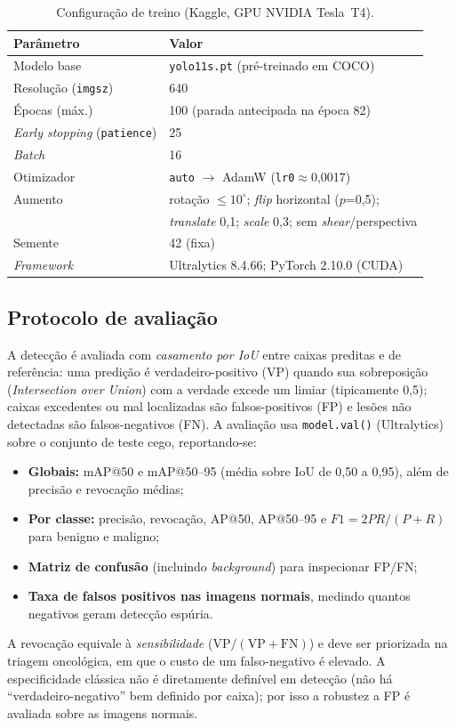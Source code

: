 \documentclass[11pt,a4paper]{article}
\begin{document}
\begin{table}[t]
\centering
\caption{Configuração de treino (Kaggle, GPU NVIDIA Tesla~T4).}
\label{tab:treino}
\small
\begin{tabular}{@{}ll@{}}
\toprule
\textbf{Parâmetro} & \textbf{Valor} \\
\midrule
Modelo base                  & \texttt{yolo11s.pt} (pré-treinado em COCO) \\
Resolução (\texttt{imgsz})   & 640 \\
Épocas (máx.)                & 100 (parada antecipada na época 82) \\
\textit{Early stopping} (\texttt{patience}) & 25 \\
\textit{Batch}               & 16 \\
Otimizador                   & \texttt{auto} $\rightarrow$ AdamW (\texttt{lr0}$\approx$0,0017) \\
Aumento                      & rotação $\leq 10^\circ$; \textit{flip} horizontal ($p$=0,5); \\
                             & \textit{translate} 0,1; \textit{scale} 0,3; sem \textit{shear}/perspectiva \\
Semente                      & 42 (fixa) \\
\textit{Framework}           & Ultralytics 8.4.66; PyTorch 2.10.0 (CUDA) \\
\bottomrule
\end{tabular}
\end{table}

\subsection{Protocolo de avaliação}\label{sec:aval}
A detecção é avaliada com \emph{casamento por IoU} entre caixas preditas e de
referência: uma predição é verdadeiro-positivo (VP) quando sua sobreposição
(\textit{Intersection over Union}) com a verdade excede um limiar (tipicamente
0,5); caixas excedentes ou mal localizadas são falsos-positivos (FP) e lesões não
detectadas são falsos-negativos (FN). A avaliação usa \texttt{model.val()}
(Ultralytics) sobre o conjunto de teste cego, reportando-se:
\begin{itemize}[noitemsep,topsep=2pt]
  \item \textbf{Globais:} mAP@50 e mAP@50--95 (média sobre IoU de 0,50 a 0,95),
        além de precisão e revocação médias;
  \item \textbf{Por classe:} precisão, revocação, AP@50, AP@50--95 e
        $F1 = 2PR/(P+R)$ para benigno e maligno;
  \item \textbf{Matriz de confusão} (incluindo \textit{background}) para
        inspecionar FP/FN;
  \item \textbf{Taxa de falsos positivos nas imagens normais}, medindo quantos
        negativos geram detecção espúria.
\end{itemize}
A revocação equivale à \emph{sensibilidade} ($\mathrm{VP}/(\mathrm{VP+FN})$) e
deve ser priorizada na triagem oncológica, em que o custo de um falso-negativo é
elevado. A especificidade clássica não é diretamente definível em detecção (não há
``verdadeiro-negativo'' bem definido por caixa); por isso a robustez a FP é
avaliada sobre as imagens normais.
\end{document}

